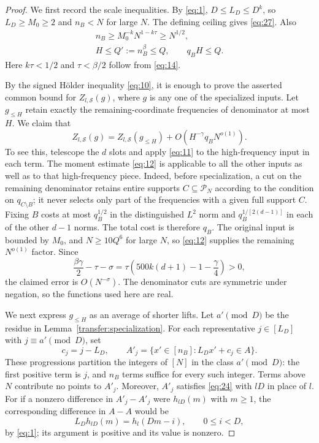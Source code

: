 \begin{proof}
We first record the scale inequalities.  By \eqref{eq:1},
$D\le L_D\le D^k$, so $L_D\ge M_0\ge2$ and $n_B<N$ for large $N$.
The defining ceiling gives \eqref{eq:27}.  Also
\begin{gather*}
 n_B\ge M_0^{-k}N^{1-k\tau}\ge N^{1/2},\\
 H\le Q':=n_B^\beta\le Q,
 \qquad q_BH\le Q.
\end{gather*}
Here $k\tau<1/2$ and $\tau<\beta/2$ follow from \eqref{eq:14}.

By the signed H\"older inequality \eqref{eq:10}, it is enough to prove
the asserted common bound for $Z_{l,\mathcal S}(g)$, where $g$ is any
one of the specialized inputs.  Let $g_{\le H}$ retain exactly the
remaining-coordinate frequencies of denominator at most $H$.
We claim that
\[
 Z_{l,\mathcal S}(g)
 =Z_{l,\mathcal S}(g_{\le H})
   +O(H^{-\gamma}q_BN^{o(1)}).
\]
To see this, telescope the $d$ slots and apply \eqref{eq:11} to the
high-frequency input in each term.  The moment estimate \eqref{eq:12}
is applicable to all the other inputs as well as to that high-frequency
piece.  Indeed, before specialization, a cut on the remaining denominator
retains entire supports $C\subseteq\mathcal P_N$ according to the
condition on $q_{C\setminus B}$; it never selects only part of the
frequencies with a given full support $C$.  Fixing $B$ costs at most
$q_B^{1/2}$ in the distinguished $L^2$ norm and
$q_B^{1/[2(d-1)]}$ in each of the other $d-1$ norms.  The total cost is
therefore $q_B$.  The original input is bounded by $M_0$, and
$N\ge10Q^6$ for large $N$, so \eqref{eq:12} supplies the remaining
$N^{o(1)}$ factor.  Since
\[
 \frac{\beta\gamma}{2}-\tau-\sigma
 =\tau\left(500k(d+1)-1-\frac\gamma4\right)>0,
\]
the claimed error is $O(N^{-\sigma})$.  The denominator cuts are
symmetric under negation, so the functions used here are real.

We next express $g_{\le H}$ as an average of shorter lifts.  Let
$a'\pmod D$ be the residue in Lemma~\ref{transfer:specialization}.
For each representative $j\in[L_D]$ with $j\equiv a'\pmod D$, set
\[
 c_j=j-L_D,\qquad
 A'_j=\{x'\in[n_B]:L_Dx'+c_j\in A\}.
\]
These progressions partition the integers of $[N]$ in the class
$a'\pmod D$: the first positive term is $j$, and $n_B$ terms suffice
for every such integer.  Terms above $N$ contribute no points to $A'_j$.
Moreover, $A'_j$ satisfies \eqref{eq:24} with $lD$ in place of $l$.
For if a nonzero difference in $A'_j-A'_j$ were $h_{lD}(m)$ with
$m\ge1$, the corresponding difference in $A-A$ would be
\[
 L_Dh_{lD}(m)=h_l(Dm-i),\qquad 0\le i<D,
\]
by \eqref{eq:1}; its argument is positive and its value is nonzero.


\end{proof}

